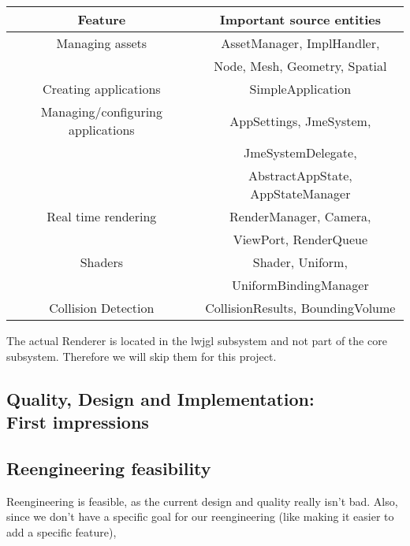 \documentclass[a4paper, 10pt]{article}
\begin{document}
\begin{tabular}{| c | c |}
  \hline
  \textbf{Feature}                  & \textbf{Important source entities} \\
  \hline
  \hline
  Managing assets                   & AssetManager, ImplHandler, \\
				    & Node, Mesh, Geometry, Spatial \\
  \hline
  Creating applications             & SimpleApplication \\
  \hline
  Managing/configuring applications & AppSettings, JmeSystem, \\
                                    & JmeSystemDelegate, \\
                                    & AbstractAppState, AppStateManager \\
  \hline
  Real time rendering               & RenderManager, Camera,  \\
                                    & ViewPort, RenderQueue \\
  \hline
  Shaders                           & Shader, Uniform, \\
                                    & UniformBindingManager \\
  \hline
  Collision Detection		    & CollisionResults, BoundingVolume\\
  \hline
\end{tabular}
\newline
\newline
The actual Renderer is located in the lwjgl subsystem 
and not part of the core subsystem. 
Therefore we will skip them for this project.
 

\subsection{Quality, Design and Implementation:\\First impressions}
\label{sec:first_impressions}



\subsection{Reengineering feasibility}
\label{sec:reengineering_feasibility}
Reengineering is feasible, as the current design and quality really isn't bad.
Also, since we don't have a specific goal for our reengineering 
(like making it easier to add a specific feature), 
\end{document}
